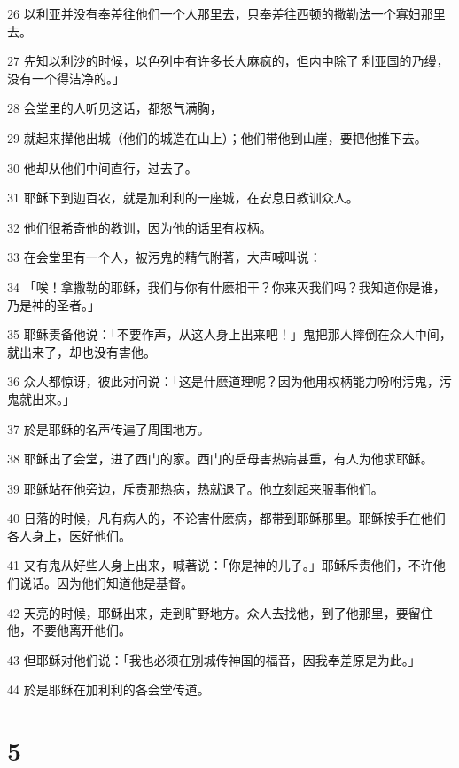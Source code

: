 \par 26 以利亚并没有奉差往他们一个人那里去，只奉差往西顿的撒勒法一个寡妇那里去。
\par 27 先知以利沙的时候，以色列中有许多长大麻疯的，但内中除了利亚国的乃缦，没有一个得洁净的。」
\par 28 会堂里的人听见这话，都怒气满胸，
\par 29 就起来撵他出城（他们的城造在山上）；他们带他到山崖，要把他推下去。
\par 30 他却从他们中间直行，过去了。
\par 31 耶稣下到迦百农，就是加利利的一座城，在安息日教训众人。
\par 32 他们很希奇他的教训，因为他的话里有权柄。
\par 33 在会堂里有一个人，被污鬼的精气附著，大声喊叫说：
\par 34 「唉！拿撒勒的耶稣，我们与你有什麽相干？你来灭我们吗？我知道你是谁，乃是神的圣者。」
\par 35 耶稣责备他说：「不要作声，从这人身上出来吧！」鬼把那人摔倒在众人中间，就出来了，却也没有害他。
\par 36 众人都惊讶，彼此对问说：「这是什麽道理呢？因为他用权柄能力吩咐污鬼，污鬼就出来。」
\par 37 於是耶稣的名声传遍了周围地方。
\par 38 耶稣出了会堂，进了西门的家。西门的岳母害热病甚重，有人为他求耶稣。
\par 39 耶稣站在他旁边，斥责那热病，热就退了。他立刻起来服事他们。
\par 40 日落的时候，凡有病人的，不论害什麽病，都带到耶稣那里。耶稣按手在他们各人身上，医好他们。
\par 41 又有鬼从好些人身上出来，喊著说：「你是神的儿子。」耶稣斥责他们，不许他们说话。因为他们知道他是基督。
\par 42 天亮的时候，耶稣出来，走到旷野地方。众人去找他，到了他那里，要留住他，不要他离开他们。
\par 43 但耶稣对他们说：「我也必须在别城传神国的福音，因我奉差原是为此。」
\par 44 於是耶稣在加利利的各会堂传道。

\chapter{5}

